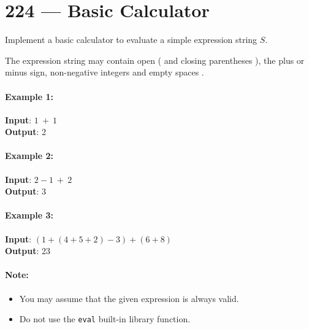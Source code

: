 \section{224 --- Basic Calculator}
Implement a basic calculator to evaluate a simple expression string $S$.
\par
The expression string may contain open ( and closing parentheses ), the plus or minus sign, non-negative integers and empty spaces .

\paragraph{Example 1:}
\begin{flushleft}
\textbf{Input}: $1\ +\ 1$
\\
\textbf{Output}: 2
\end{flushleft}

\paragraph{Example 2:}
\begin{flushleft}
\textbf{Input}: $2-1\ +\ 2$
\\
\textbf{Output}: 3
\end{flushleft}

\paragraph{Example 3:}
\begin{flushleft}
\textbf{Input}: $(1+(4+5+2)-3)+(6+8)$
\\
\textbf{Output}: 23
\end{flushleft}

\paragraph{Note:}

\begin{itemize}
\item You may assume that the given expression is always valid.
\item Do not use the \texttt{eval} built-in library function.
\end{itemize}
